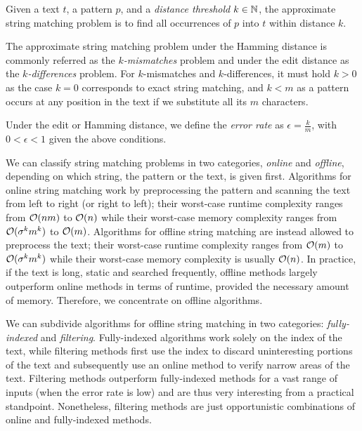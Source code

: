 \begin{definition}
Given a text $t$, a pattern $p$, and a \emph{distance threshold} $k \in \mathbb {N}$, the approximate string matching problem is to find all occurrences of $p$ into $t$ within distance $k$.
\end{definition}
The approximate string matching problem under the Hamming distance is commonly referred as the \emph{$k$-mismatches} problem and under the edit distance as the \emph{$k$-differences} problem.
For $k$-mismatches and $k$-differences, it must hold $k > 0$ as the case $k = 0$ corresponds to exact string matching, and $k < m$ as a pattern occurs at any position in the text if we substitute all its $m$ characters.
\begin{definition}
Under the edit or Hamming distance, we define the \emph{error rate} as $\epsilon = \frac{k}{m}$, with $0 < \epsilon < 1$ given the above conditions.
\end{definition}

We can classify string matching problems in two categories, \emph{online} and \emph{offline}, depending on which string, the pattern or the text, is given first.
Algorithms for online string matching work by preprocessing the pattern and scanning the text from left to right (or right to left); their worst-case runtime complexity ranges from $\mathcal{O}(nm)$ to $\mathcal{O}(n)$ while their worst-case memory complexity ranges from $\mathcal{O}(\sigma^k m^k)$ to $\mathcal{O}(m)$.
Algorithms for offline string matching are instead allowed to preprocess the text; their worst-case runtime complexity ranges from $\mathcal{O}(m)$ to $\mathcal{O}(\sigma^k m^k)$ while their worst-case memory complexity is usually $\mathcal{O}(n)$.
In practice, if the text is long, static and searched frequently, offline methods largely outperform online methods in terms of runtime, provided the necessary amount of memory. Therefore, we concentrate on offline algorithms.

We can subdivide algorithms for offline string matching in two categories: \emph{fully-indexed} and \emph{filtering}.
Fully-indexed algorithms work solely on the index of the text, while filtering methods first use the index to discard uninteresting portions of the text and subsequently use an online method to verify narrow areas of the text.
Filtering methods outperform fully-indexed methods for a vast range of inputs (when the error rate is low) and are thus very interesting from a practical standpoint. Nonetheless, filtering methods are just opportunistic combinations of online and fully-indexed methods.

